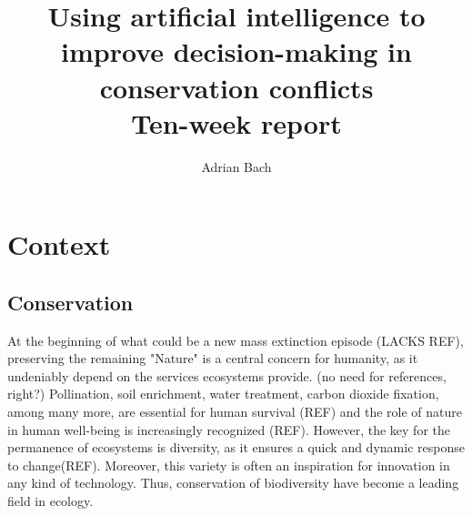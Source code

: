 \documentclass[12pt,a4paper]{article}
\author{Adrian Bach}
\title{Using artificial intelligence to improve decision-making in conservation conflicts \\\medskip Ten-week report}
\begin{document}
\maketitle

\tableofcontents

\newpage
\section{Context}
\subsection{Conservation}

At the beginning of what could be a new mass extinction episode (LACKS REF), preserving the remaining "Nature" is a central concern for humanity, as it undeniably depend on the services ecosystems provide. (no need for references, right?)
Pollination, soil enrichment, water treatment, carbon dioxide fixation, among many more, are essential for human survival (REF) and the role of nature in human well-being is increasingly recognized (REF).
However, the key for the permanence of ecosystems is diversity, as it ensures a quick and dynamic response to change(REF).
Moreover, this variety is often an inspiration for innovation in any kind of technology.
Thus, conservation of biodiversity have become a leading field in ecology.
%
%
\end{document}
